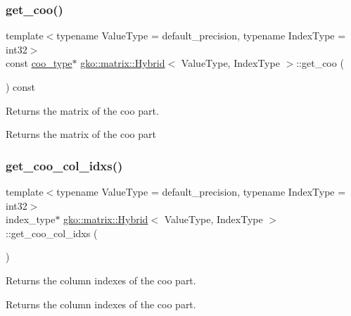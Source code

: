 \subsubsection{\texorpdfstring{get\+\_\+coo()}{get\_coo()}}
{\footnotesize\ttfamily template$<$typename Value\+Type = default\+\_\+precision, typename Index\+Type = int32$>$ \\
const \hyperlink{classgko_1_1matrix_1_1Coo}{coo\+\_\+type}$\ast$ \hyperlink{classgko_1_1matrix_1_1Hybrid}{gko\+::matrix\+::\+Hybrid}$<$ Value\+Type, Index\+Type $>$\+::get\+\_\+coo (\begin{DoxyParamCaption}{ }\end{DoxyParamCaption}) const\hspace{0.3cm}{\ttfamily [noexcept]}}



Returns the matrix of the coo part. 

\begin{DoxyReturn}{Returns}
the matrix of the coo part 
\end{DoxyReturn}
\mbox{\label{classgko_1_1matrix_1_1Hybrid_a327548f42867b201cd469f3a21145c87}} 
\subsubsection{\texorpdfstring{get\+\_\+coo\+\_\+col\+\_\+idxs()}{get\_coo\_col\_idxs()}}
{\footnotesize\ttfamily template$<$typename Value\+Type = default\+\_\+precision, typename Index\+Type = int32$>$ \\
index\+\_\+type$\ast$ \hyperlink{classgko_1_1matrix_1_1Hybrid}{gko\+::matrix\+::\+Hybrid}$<$ Value\+Type, Index\+Type $>$\+::get\+\_\+coo\+\_\+col\+\_\+idxs (\begin{DoxyParamCaption}{ }\end{DoxyParamCaption})\hspace{0.3cm}{\ttfamily [noexcept]}}



Returns the column indexes of the coo part. 

\begin{DoxyReturn}{Returns}
the column indexes of the coo part. 
\end{DoxyReturn}
\mbox{\label{classgko_1_1matrix_1_1Hybrid_a2fe06adb3323dcad710329e33a12dff4}} 
